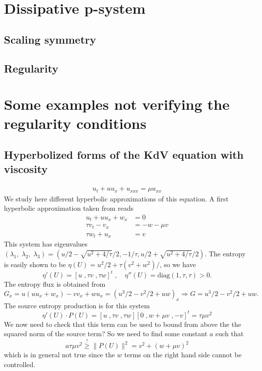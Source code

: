 \documentclass{article}
\theoremstyle{plain}
\theoremstyle{definition}
\numberwithin{theorem}{section}
\begin{document}
\section{Dissipative p-system}

\subsection{Scaling symmetry}

\subsection{Regularity}


\section{Some examples not verifying the regularity conditions}

\subsection{Hyperbolized forms of the KdV equation with viscosity}

\begin{align}
    u_t + u u_x + u_{xxx} = \mu u_{xx}
\end{align}
We study here different hyperbolic approximations of this equation.
A first  hyperbolic approximation taken from \cite{giesselmann2025convergence} reads
\begin{subequations} \label{vkdvh1}
\begin{align}
    u_t + u u_x  + w_x & = 0 \\
    \tau v_t   - v_x  & = -w -\mu v\\
        \tau w_t +  u_x & = v
\end{align}
\end{subequations}
This system has eigenvalues $(\lambda_1,\; \lambda_2,\;\lambda_3)=(u/2 - \sqrt{u^2+4/\tau}/2, -1/\tau, u/2+ \sqrt{u^2+4/\tau}/2)$.
The entropy is easily shown to be $\eta(U) = u^2/2 + \tau (v^2+w^2)/$, so we have
$$
\eta'(U)= [u\;, \tau v\;, \tau w]^t\;,\quad
\eta''(U) =  \text{diag}(1,\tau,\tau) >0.
$$
The entropy flux is obtained from
$$
G_x =u (u u_x  + w_x) - v v_x + wu_x = ( u^3/2 - v^2/2  + uw )_x\Rightarrow G = u^3/2 - v^2/2  + uw.
$$
The source entropy production is for this system
$$
\eta'(U)\cdot P(U) = [u\;, \tau v\;, \tau w] [0\;, w +\mu v\;, -v]^t = \tau \mu v^2
$$
We now need to check that this term can be used to bound from above the the squared norm of the source term?
So we need to find some constant $a$ such that
$$
  a \tau \mu   v^2 \stackrel{?}{\ge} \|P(U)\|^2 = v^2 + (w +\mu v)^2
$$
which is in general not true since the $w$ terms on the right hand side cannot be controlled.\\
\end{document}
